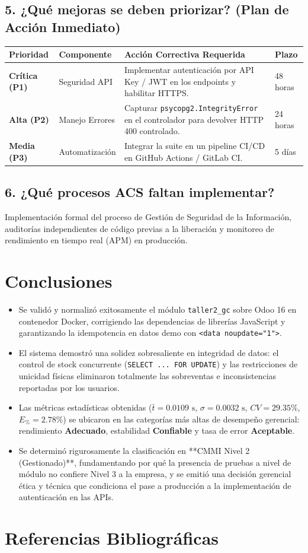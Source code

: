 \documentclass{article}
\begin{document}
\subsection{5. ¿Qué mejoras se deben priorizar? (Plan de Acción Inmediato)}
\begin{center}
\begin{tabular}{|l|l|p{}|l|}
\hline
\textbf{Prioridad} & \textbf{Componente} & \textbf{Acción Correctiva Requerida} & \textbf{Plazo}\\ \hline
\textbf{Crítica (P1)} & Seguridad API & Implementar autenticación por API Key / JWT en los endpoints y habilitar HTTPS. & 48 horas\\ \hline
\textbf{Alta (P2)} & Manejo Errores & Capturar \texttt{psycopg2.IntegrityError} en el controlador para devolver HTTP 400 controlado. & 24 horas\\ \hline
\textbf{Media (P3)} & Automatización & Integrar la suite en un pipeline CI/CD en GitHub Actions / GitLab CI. & 5 días\\
\hline
\end{tabular}
\end{center}

\subsection{6. ¿Qué procesos ACS faltan implementar?}
Implementación formal del proceso de Gestión de Seguridad de la Información, auditorías independientes de código previas a la liberación y monitoreo de rendimiento en tiempo real (APM) en producción.

\section{Conclusiones}
\begin{itemize}[leftmargin=*]
\item Se validó y normalizó exitosamente el módulo \texttt{taller2\_gc} sobre Odoo 16 en contenedor Docker, corrigiendo las dependencias de librerías JavaScript y garantizando la idempotencia en datos demo con \texttt{<data noupdate="1">}.
\item El sistema demostró una solidez sobresaliente en integridad de datos: el control de stock concurrente (\texttt{SELECT ... FOR UPDATE}) y las restricciones de unicidad físicas eliminaron totalmente las sobreventas e inconsistencias reportadas por los usuarios.
\item Las métricas estadísticas obtenidas ($\bar{t} = 0.0109\text{ s}$, $\sigma = 0.0032\text{ s}$, $CV = 29.35\%$, $E_{\%} = 2.78\%$) se ubicaron en las categorías más altas de desempeño gerencial: rendimiento \textbf{Adecuado}, estabilidad \textbf{Confiable} y tasa de error \textbf{Aceptable}.
\item Se determinó rigurosamente la clasificación en **CMMI Nivel 2 (Gestionado)**, fundamentando por qué la presencia de pruebas a nivel de módulo no confiere Nivel 3 a la empresa, y se emitió una decisión gerencial ética y técnica que condiciona el pase a producción a la implementación de autenticación en las APIs.
\end{itemize}

\section{Referencias Bibliográficas}


\nocite{*}
\end{document}
